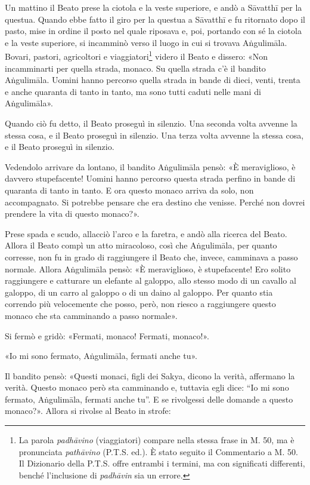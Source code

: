 Un mattino il Beato prese la ciotola e la veste superiore, e andò a Sāvatthī per
la questua. Quando ebbe fatto il giro per la questua a Sāvatthī e fu ritornato
dopo il pasto, mise in ordine il posto nel quale riposava e, poi, portando con
sé la ciotola e la veste superiore, si incamminò verso il luogo in cui si
trovava Aṅgulimāla. Bovari, pastori, agricoltori e viaggiatori\footnote{La
  parola \emph{padhāvino} (viaggiatori) compare nella stessa frase in M. 50, ma
  è pronunciata \emph{pathāvino} (P.T.S. ed.). È stato seguito il Commentario a
  M. 50. Il Dizionario della P.T.S. offre entrambi i termini, ma con significati
  differenti, benché l’inclusione di \emph{padhāvin} sia un errore.} videro il
Beato e dissero: «Non incamminarti per quella strada, monaco. Su quella strada
c’è il bandito Aṅgulimāla. Uomini hanno percorso quella strada in bande di
dieci, venti, trenta e anche quaranta di tanto in tanto, ma sono tutti caduti
nelle mani di Aṅgulimāla».

Quando ciò fu detto, il Beato proseguì in silenzio. Una seconda volta avvenne la
stessa cosa, e il Beato proseguì in silenzio. Una terza volta avvenne la stessa
cosa, e il Beato proseguì in silenzio.

Vedendolo arrivare da lontano, il bandito Aṅgulimāla pensò: «È meraviglioso, è
davvero stupefacente! Uomini hanno percorso questa strada perfino in bande di
quaranta di tanto in tanto. E ora questo monaco arriva da solo, non
accompagnato. Si potrebbe pensare che era destino che venisse. Perché non dovrei
prendere la vita di questo monaco?».

Prese spada e scudo, allacciò l’arco e la faretra, e andò alla ricerca del
Beato. Allora il Beato compì un atto miracoloso, così che Aṅgulimāla, per quanto
corresse, non fu in grado di raggiungere il Beato che, invece, camminava a passo
normale. Allora Aṅgulimāla pensò: «È meraviglioso, è stupefacente! Ero solito
raggiungere e catturare un elefante al galoppo, allo stesso modo di un cavallo
al galoppo, di un carro al galoppo o di un daino al galoppo. Per quanto stia
correndo più velocemente che posso, però, non riesco a raggiungere questo monaco
che sta camminando a passo normale».

Si fermò e gridò: «Fermati, monaco! Fermati, monaco!».

«Io mi sono fermato, Aṅgulimāla, fermati anche tu».

Il bandito pensò: «Questi monaci, figli dei Sakya, dicono la verità, affermano
la verità. Questo monaco però sta camminando e, tuttavia egli dice: “Io mi sono
fermato, Aṅgulimāla, fermati anche tu”. E se rivolgessi delle domande a questo
monaco?». Allora si rivolse al Beato in strofe:

